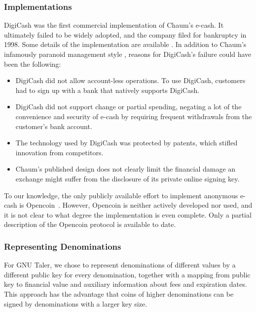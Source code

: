 \subsubsection{Implementations}
DigiCash was the first commercial implementation of Chaum's e-cash.  It
ultimately failed to be widely adopted, and the company filed for bankruptcy in
1998.  Some details of the implementation are available
\cite{schoenmakers1997security}.  In addition to Chaum's infamously paranoid
management style \cite{next1999digicash}, reasons for DigiCash's failure could
have been the following:

\begin{itemize}
 \item DigiCash did not allow account-less operations.  To use DigiCash,
   customers had to sign up with a bank that natively supports DigiCash.
 \item DigiCash did not support change or partial spending, negating a lot of
   the convenience and security of e-cash by requiring frequent withdrawals
    from the customer's bank account.
 \item The technology used by DigiCash was protected by patents,
   which stifled innovation from competitors.
 \item Chaum's published design does not clearly limit the financial damage an
   exchange might suffer from the disclosure of its private online signing key.
\end{itemize}

To our knowledge, the only publicly available effort to implement anonymous
e-cash is Opencoin~\cite{dent2008extensions}.  However, Opencoin is neither
actively developed nor used, and it is not clear to what degree the
implementation is even complete.  Only a partial description of the Opencoin
protocol is available to date.


\subsubsection{Representing Denominations}\label{design:related-different-denominations}

For GNU Taler, we chose to represent denominations of different values by a
different public key for every denomination, together with a mapping from
public key to financial value and auxiliary information about fees and
expiration dates.  This approach has the advantage that coins of higher denominations
can be signed by denominations with a larger key size.

